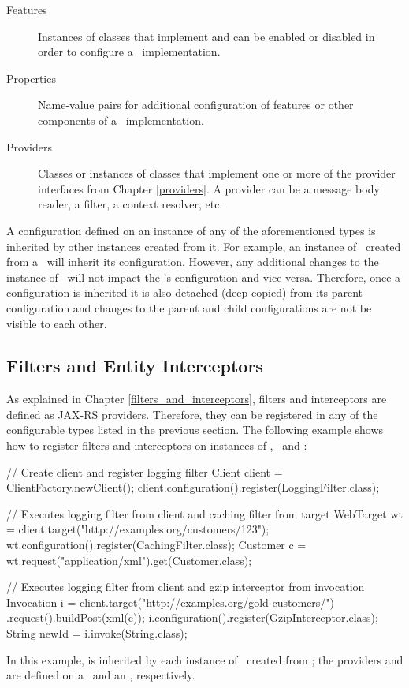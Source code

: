 \begin{description}
\item [Features] Instances of classes that implement  and can be enabled or disabled in order to configure a \jaxrs\ implementation.
\item [Properties] Name-value pairs for additional configuration of features or other components of a \jaxrs\ implementation.
\item [Providers] Classes or instances of classes that implement one or more of the provider interfaces from Chapter \ref{providers}. A provider can be a message body reader, a filter, a context resolver, etc. 
\end{description}

A configuration defined on an instance of any of the aforementioned types is inherited by other instances created from it. For example, an instance of \WebTarget\ created from a \Client\ will inherit its configuration. However, any additional changes to the instance of \WebTarget\ will not impact the \Client's configuration and vice versa. Therefore, once a configuration is inherited it is also detached (deep copied) from its parent configuration and changes to the parent and child configurations are not be visible to each other.

\subsection{Filters and Entity Interceptors}
\label{filters_interceptors_client}

As explained in Chapter \ref{filters_and_interceptors}, filters and interceptors are defined as JAX-RS providers. Therefore, they can be registered in any of the configurable types listed in the previous section. The following example shows how to register filters and interceptors on instances of \Client, \WebTarget\ and \Invocation:

\begin{listing}{1}
// Create client and register logging filter
Client client = ClientFactory.newClient();
client.configuration().register(LoggingFilter.class);

// Executes logging filter from client and caching filter from target
WebTarget wt = client.target("http://examples.org/customers/123");
wt.configuration().register(CachingFilter.class);
Customer c = wt.request("application/xml").get(Customer.class);

// Executes logging filter from client and gzip interceptor from invocation
Invocation i = client.target("http://examples.org/gold-customers/")
    .request().buildPost(xml(c));
i.configuration().register(GzipInterceptor.class);
String newId = i.invoke(String.class);
\end{listing}

In this example,  is inherited by each instance of \WebTarget\ created from ; the providers  and  are defined on a \WebTarget\ and an \Invocation, respectively.








